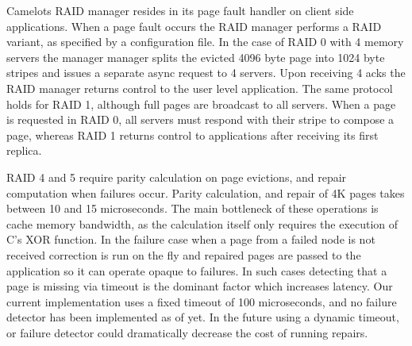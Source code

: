 Camelots RAID manager resides in its page fault handler on client side
applications. When a page fault occurs the RAID manager performs a
RAID variant, as specified by a configuration file. In the case of
RAID 0 with 4 memory servers the manager manager splits the evicted
4096 byte page into 1024 byte stripes and issues a separate async
request to 4 servers. Upon receiving 4 acks the RAID manager returns
control to the user level application. The same protocol holds for
RAID 1, although full pages are broadcast to all servers. When a page
is requested in RAID 0, all servers must respond with their stripe to
compose a page, whereas RAID 1 returns control to applications after
receiving its first replica.

RAID 4 and 5 require parity calculation on page evictions, and
repair computation when failures occur. Parity calculation, and
repair of 4K pages takes between 10 and 15 microseconds. The main
bottleneck of these operations is cache memory bandwidth, as the
calculation itself only requires the execution of C's XOR function. In
the failure case when a page from a failed node is not received
correction is run on the fly and repaired pages are passed to the
application so it can operate opaque to failures. In such cases
detecting that a page is missing via timeout is the dominant factor
which increases latency. Our current implementation uses a fixed
timeout of 100 microseconds, and no failure detector has been
implemented as of yet. In the future using a dynamic timeout, or
failure detector could dramatically decrease the cost of running
repairs.


